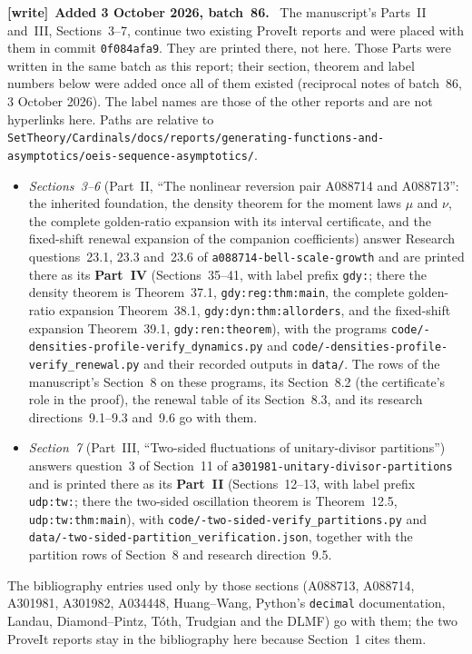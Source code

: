 \documentclass[11pt,letterpaper]{article}
\numberwithin{equation}{section}
\theoremstyle{definition}
\theoremstyle{remark}
\newenvironment{writenote}[1][]{\par\smallskip\begingroup\small
 \noindent\textbf{[write]}\if\relax\detokenize{#1}\relax\else~\textbf{#1.}\fi\ }%
 {\par\endgroup\smallskip}
\begin{document}
\begin{writenote}[Added 3 October 2026, batch~86]
The manuscript's Parts~II and~III, Sections~3--7, continue two existing
ProveIt reports and were placed with them in commit \texttt{0f084afa9}.
They are printed there, not here. Those Parts were written in the same
batch as this report; their section, theorem and label numbers below were
added once all of them existed (reciprocal notes of batch~86, 3 October
2026). The label names are those of the other reports and are not
hyperlinks here. Paths are
relative to \texttt{SetTheory/\allowbreak Cardinals/\allowbreak docs/\allowbreak reports/\allowbreak generating-\allowbreak functions-\allowbreak and-\allowbreak asymptotics/\allowbreak oeis-\allowbreak sequence-\allowbreak asymptotics/}.
\begin{itemize}
 \item \emph{Sections~3--6} (Part~II, ``The nonlinear reversion pair
 A088714 and A088713'': the inherited foundation, the density theorem for
 the moment laws $\mu$ and $\nu$, the complete golden-ratio expansion with
 its interval certificate, and the fixed-shift renewal expansion of the
 companion coefficients) answer Research questions~23.1, 23.3 and~23.6 of
 \texttt{a088714-\allowbreak bell-\allowbreak scale-\allowbreak growth}
 \cite{goldenprior} and are printed there as its \textbf{Part~IV}
 (Sections~35--41, with label prefix \texttt{gdy:}; there the density
 theorem is Theorem~37.1, \nolinkurl{gdy:reg:thm:main}, the complete golden-ratio
 expansion Theorem~38.1, \nolinkurl{gdy:dyn:thm:allorders}, and the
 fixed-shift expansion Theorem~39.1, \nolinkurl{gdy:ren:theorem}),
 with the programs \texttt{code/-\allowbreak densities-\allowbreak profile-\allowbreak verify\_\allowbreak dynamics.py} and
 \texttt{code/-\allowbreak densities-\allowbreak profile-\allowbreak verify\_\allowbreak renewal.py} and their recorded outputs in
 \texttt{data/}. The rows of the manuscript's Section~8 on these programs,
 its Section~8.2 (the certificate's role in the proof), the renewal table
 of its Section~8.3, and its research directions~9.1--9.3 and~9.6 go with
 them.
 \item \emph{Section~7} (Part~III, ``Two-sided fluctuations of
 unitary-divisor partitions'') answers question~3 of Section~11 of
 \texttt{a301981-\allowbreak unitary-\allowbreak divisor-\allowbreak partitions}
 \cite{unitaryprior} and is printed there as its \textbf{Part~II}
 (Sections~12--13, with label prefix \texttt{udp:tw:}; there the two-sided
 oscillation theorem is Theorem~12.5, \nolinkurl{udp:tw:thm:main}),
 with \texttt{code/-\allowbreak two-\allowbreak sided-\allowbreak verify\_\allowbreak partitions.py} and
 \texttt{data/-\allowbreak two-\allowbreak sided-\allowbreak partition\_\allowbreak verification.json}, together with
 the partition rows of Section~8 and research direction~9.5.
\end{itemize}
The bibliography entries used only by those sections (A088713, A088714,
A301981, A301982, A034448, Huang--Wang, Python's \texttt{decimal}
documentation, Landau, Diamond--Pintz, T\'oth, Trudgian and the DLMF) go with
them; the two ProveIt reports stay in the bibliography here because
Section~1 cites them.


\end{writenote}
\end{document}
